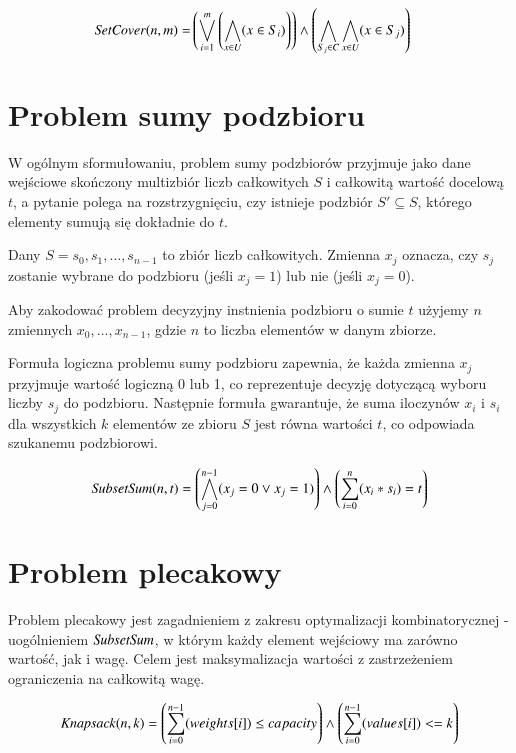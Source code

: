 \begin{align*}
	{\mathit{SetCover}}(n, m) = &\left( \bigvee_{i=1}^{m} \left( \bigwedge_{x\in U} (x \in S_i) \right) \right) \land 
	\left( \bigwedge_{S_j\in C} \bigwedge_{x\in U} (x \in S_j) \right)
\end{align*}


\section{Problem sumy podzbioru}
W ogólnym sformułowaniu, problem sumy podzbiorów przyjmuje jako dane wejściowe
skończony multizbiór liczb całkowitych $S$ i całkowitą wartość docelową $t$,
a pytanie polega na rozstrzygnięciu, czy istnieje podzbiór $S' \subseteq S$,
którego elementy sumują się dokładnie do $t$.



Dany $S = {s_0, s_1, \ldots, s_{n-1}}$ to zbiór liczb całkowitych. Zmienna $x_j$ oznacza, czy $s_j$ zostanie wybrane do podzbioru (jeśli $x_j = 1$) lub nie (jeśli $x_j = 0$).

Aby zakodować problem decyzyjny instnienia podzbioru o sumie $t$ użyjemy $n$ zmiennych $x_0,\ldots,x_{n-1}$, gdzie $n$ to liczba elementów w danym zbiorze.

Formuła logiczna problemu sumy podzbioru zapewnia, że każda zmienna $x_j$ przyjmuje wartość logiczną 0 lub 1, co reprezentuje decyzję dotyczącą wyboru liczby $s_j$ do podzbioru. Następnie formuła gwarantuje, że suma iloczynów $x_i$ i $s_i$ dla wszystkich \(k\) elementów ze zbioru $S$ jest równa wartości $t$, co odpowiada szukanemu podzbiorowi.

\begin{align*}
	{\mathit{SubsetSum}}(n, t) = \left( \bigwedge_{j=0}^{n-1} (x_j = 0 \lor x_j = 1) \right) \land 
	\left( \sum_{i=0}^{n} (x_i * s_i) = t \right)
\end{align*}





\section{Problem plecakowy}
Problem plecakowy jest zagadnieniem z zakresu optymalizacji kombinatorycznej - uogólnieniem ${\mathit{SubsetSum}}$, w którym każdy element wejściowy ma zarówno wartość, jak i wagę. Celem jest maksymalizacja wartości z zastrzeżeniem ograniczenia na całkowitą wagę.

\begin{align*}
	{\mathit{Knapsack}}(n, k) = \left( \sum_{i=0}^{n-1} (weights[i]) \leq capacity \right) \land 
	\left( \sum_{i=0}^{n-1} (values[i]) <= k \right)
\end{align*}


